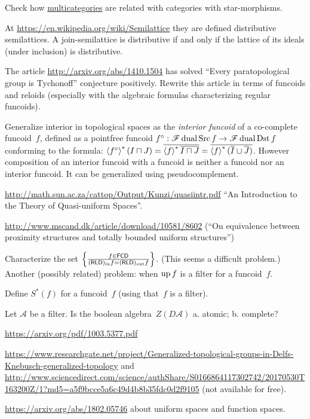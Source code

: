 \documentclass{amsart}
\begin{document}
Check how \href{http://ncatlab.org/nlab/show/multicategory}{multicategories}
are related with categories with star-morphisms.

At \url{https://en.wikipedia.org/wiki/Semilattice} they are defined distributive
semilattices. A join-semilattice is distributive if and only if the lattice of its ideals (under inclusion) is distributive.

The article \url{http://arxiv.org/abs/1410.1504} has solved ``Every paratopological group is Tychonoff'' conjecture positively.
Rewrite this article in terms of funcoids and reloids (especially with the algebraic formulas characterizing regular funcoids).

Generalize interior in topological spaces as the \emph{interior funcoid} of a co-complete funcoid~$f$, defined as a pointfree funcoid
$f^\circ: \mathscr{F}\operatorname{dual}\operatorname{Src} f \rightarrow \mathscr{F}\operatorname{dual}\operatorname{Dst} f$ conforming to the formula:
$\left\langle f^{\circ}\right\rangle ^{\ast} (I \sqcap J) = \overline{\left\langle f\right\rangle ^{\ast} \overline{I \sqcap J}} = \overline{\left\langle f\right\rangle ^{\ast} ( \overline{I} \sqcup \overline{J} )}$.
However composition of an interior funcoid with a funcoid is neither a funcoid nor an interior funcoid.
It can be generalized using pseudocomplement.

\url{http://math.sun.ac.za/cattop/Output/Kunzi/quasiintr.pdf} ``An Introduction to the Theory of Quasi-uniform Spaces''.

\url{http://www.mscand.dk/article/download/10581/8602} (``On equivalence between proximity structures and totally bounded uniform structures'')

Characterize the set $\left\{ \frac{f\in\mathsf{FCD}}{(\mathsf{RLD})_{\mathrm{in}} f=(\mathsf{RLD})_{\mathrm{out}} f}\right\}$. (This seems a difficult problem.)
Another (possibly related) problem: when $\operatorname{up} f$ is a filter for a funcoid~$f$.

Define $S^\ast (f)$ for a funcoid~$f$ (using that~$f$ is a filter).

Let $\mathcal{A}$ be a filter. Is the boolean algebra~$Z(D\mathcal{A})$
a. atomic; b. complete?

\url{https://arxiv.org/pdf/1003.5377.pdf}

\url{https://www.researchgate.net/project/Generalized-topological-groups-in-Delfs-Knebusch-generalized-topology}
and
\url{http://www.sciencedirect.com/science/authShare/S0166864117302742/20170530T163200Z/1?md5=a5f9bcce5a6c49d4b8b35fdc0d2f9105}
(not available for free).

\url{https://arxiv.org/abs/1802.05746} about uniform spaces and
function spaces.
\end{document}
